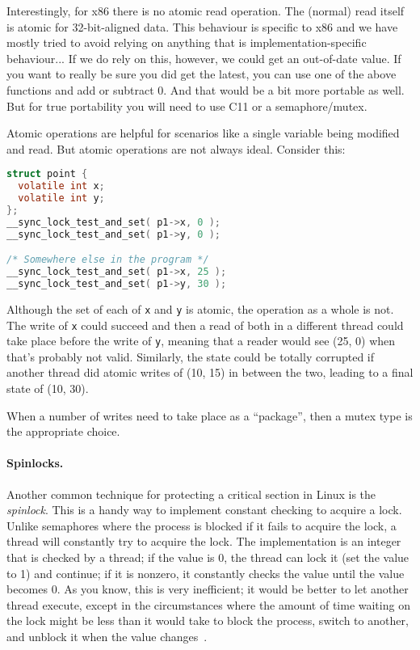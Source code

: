Interestingly, for x86 there is no atomic read operation. The (normal) read itself is atomic for 32-bit-aligned data. This behaviour is specific to x86 and we have mostly tried to avoid relying on anything that is implementation-specific behaviour... If we do rely on this, however, we could get an out-of-date value. If you want to really be sure you did get the latest, you can use one of the above functions and add or subtract 0. And that would be a bit more portable as well. But for true portability you will need to use C11 or a semaphore/mutex.

Atomic operations are helpful for scenarios like a single variable being modified and read. But atomic operations are not always ideal. Consider this:

\begin{lstlisting}[language=C]
struct point {
  volatile int x;
  volatile int y;
};
__sync_lock_test_and_set( p1->x, 0 );
__sync_lock_test_and_set( p1->y, 0 );

/* Somewhere else in the program */
__sync_lock_test_and_set( p1->x, 25 );
__sync_lock_test_and_set( p1->y, 30 );
\end{lstlisting}

Although the set of each of \texttt{x} and \texttt{y} is atomic, the operation as a whole is not. The write of \texttt{x} could succeed and then a read of both in a different thread could take place before the write of \texttt{y}, meaning that a reader would see (25, 0) when that's probably not valid. Similarly, the state could be totally corrupted if another thread did atomic writes of (10, 15) in between the two, leading to a final state of (10, 30).

When a number of writes need to take place as a ``package'', then a mutex type is the appropriate choice.

\paragraph{Spinlocks.}
Another common technique for protecting a critical section in Linux is the \textit{spinlock}. This is a handy way to implement constant checking to acquire a lock. Unlike semaphores where the process is blocked if it fails to acquire the lock, a thread will constantly try to acquire the lock. The implementation is an integer that is checked by a thread; if the value is 0, the thread can lock it (set the value to 1) and continue; if it is nonzero, it constantly checks the value until the value becomes 0. As you know, this is very inefficient; it would be better to let another thread execute, except in the circumstances where the amount of time waiting on the lock might be less than it would take to block the process, switch to another, and unblock it when the value changes~\cite{osi}.

